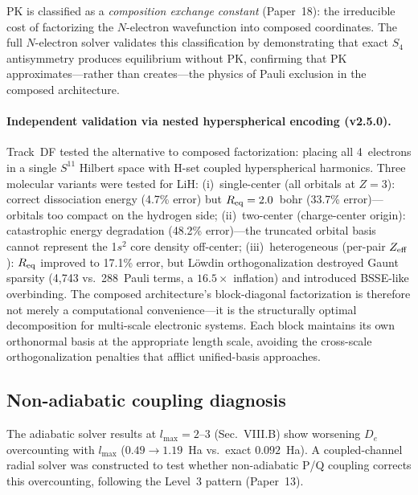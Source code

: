 \documentclass[aps,pra,twocolumn,superscriptaddress,longbibliography,floatfix]{revtex4-2}
\begin{document}
PK is classified as a \emph{composition exchange constant}
(Paper~18): the irreducible cost of factorizing the $N$-electron
wavefunction into composed coordinates.  The full $N$-electron solver
validates this classification by demonstrating that exact $S_4$
antisymmetry produces equilibrium without PK, confirming that PK
approximates---rather than creates---the physics of Pauli exclusion
in the composed architecture.

\paragraph{Independent validation via nested hyperspherical encoding
(v2.5.0).}
Track~DF tested the alternative to composed factorization: placing all
4~electrons in a single $S^{11}$ Hilbert space with H-set coupled
hyperspherical harmonics.  Three molecular variants were tested for LiH:
(i)~single-center (all orbitals at $Z = 3$): correct dissociation energy
(4.7\% error) but $R_{\rm eq} = 2.0$~bohr (33.7\% error)---orbitals
too compact on the hydrogen side;
(ii)~two-center (charge-center origin): catastrophic energy degradation
(48.2\% error)---the truncated orbital basis cannot represent the
1$s^2$ core density off-center;
(iii)~heterogeneous (per-pair $Z_{\rm eff}$): $R_{\rm eq}$ improved to
17.1\% error, but L\"owdin orthogonalization destroyed Gaunt sparsity
(4{,}743 vs.\ 288~Pauli terms, a $16.5\times$ inflation) and
introduced BSSE-like overbinding.
The composed architecture's block-diagonal factorization is therefore
not merely a computational convenience---it is the structurally optimal
decomposition for multi-scale electronic systems.  Each block maintains
its own orthonormal basis at the appropriate length scale, avoiding the
cross-scale orthogonalization penalties that afflict unified-basis
approaches.

\subsection{Non-adiabatic coupling diagnosis}

The adiabatic solver results at $l_{\max} = 2$--$3$ (Sec.~VIII.B)
show worsening $D_e$ overcounting with $l_{\max}$ ($0.49 \to
1.19$~Ha vs.\ exact $0.092$~Ha).  A coupled-channel radial solver
was constructed to test whether non-adiabatic P/Q coupling corrects
this overcounting, following the Level~3 pattern (Paper~13).
\end{document}
